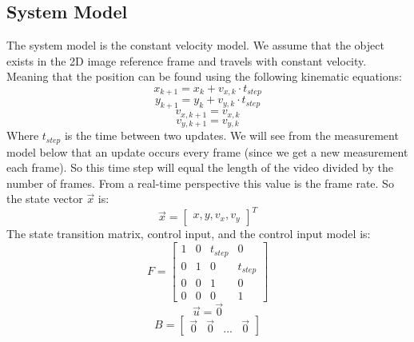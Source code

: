 \documentclass{article} %
\begin{document}
\subsection{System Model}
The system model is the constant velocity model. We assume that the object exists in the 2D image reference frame and travels with constant velocity. Meaning that the position can be found using the following kinematic equations:
\begin{equation}
x_{k+1} = x_{k} + v_{x,k} \cdot t_{step}
\end{equation}
\begin{equation}
y_{k+1} = y_{k} + v_{y,k} \cdot t_{step}
\end{equation}
\begin{equation}
v_{x, k+1} = v_{x, k}
\end{equation}
\begin{equation}
v_{y, k+1} = v_{y, k}
\end{equation}
Where $t_{step}$ is the time between two updates. We will see from the measurement model below that an update occurs every frame (since we get a new measurement each frame). So this time step will equal the length of the video divided by the number of frames. From a real-time perspective this value is the frame rate. So the state vector $\vec{x}$ is:
\[ \vec{x} = 
\begin{bmatrix}
 x, y, v_x, v_y
\end{bmatrix}^T
\]
The state transition matrix, control input, and the control input model is:
\begin{equation}
F = 
\begin{bmatrix}
1 & 0 & t_{step} & 0 \\
0 & 1 & 0 & t_{step} \\
0 & 0 & 1 & 0 \\
0 & 0 & 0 & 1 
\end{bmatrix}
\end{equation}
\begin{equation}
\vec{u} = \vec{0}
\end{equation}
\begin{equation} 
B = 
\begin{bmatrix}
\vec{0} & \vec{0} & ... & \vec{0}
\end{bmatrix}
\end{equation}
\end{document}
